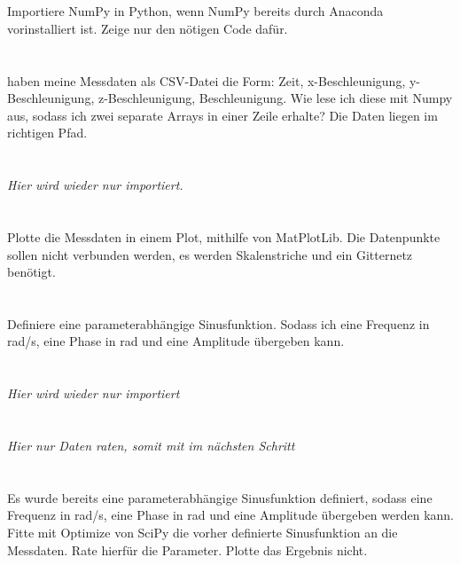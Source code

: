 \documentclass[a4paper,12pt]{article}
\begin{document}
\section{}
Importiere NumPy in Python, wenn NumPy bereits durch Anaconda vorinstalliert ist. Zeige nur den nötigen Code dafür.

\section{}
haben meine Messdaten als CSV-Datei die Form: Zeit, x-Beschleunigung, y-Beschleunigung, z-Beschleunigung, Beschleunigung.
Wie lese ich diese mit Numpy aus, sodass ich zwei separate Arrays in einer Zeile erhalte?
Die Daten liegen im richtigen Pfad.

\section{}
\textit{Hier wird wieder nur importiert.}

\section{}
Plotte die Messdaten in einem Plot, mithilfe von MatPlotLib.
Die Datenpunkte sollen nicht verbunden werden, es werden Skalenstriche und ein Gitternetz benötigt.

\section{}
Definiere eine parameterabhängige Sinusfunktion. 
Sodass ich eine Frequenz in rad/s, eine Phase in rad und eine Amplitude übergeben kann.

\section{}
\textit{Hier wird wieder nur importiert}

\section{}
\textit{Hier nur Daten raten, somit mit im nächsten Schritt}

\section{}
Es wurde bereits eine parameterabhängige Sinusfunktion definiert, sodass eine Frequenz in rad/s, eine Phase in rad und eine Amplitude übergeben werden kann.
Fitte mit Optimize von SciPy die vorher definierte Sinusfunktion an die Messdaten. Rate hierfür die Parameter. Plotte das Ergebnis nicht.
\end{document}
